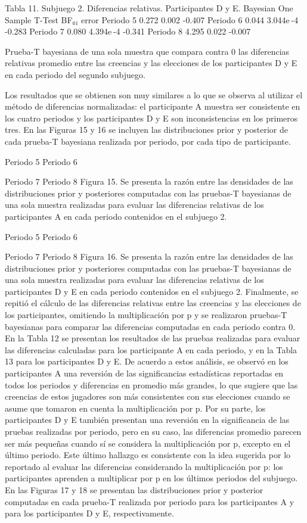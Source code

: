 Tabla 11. Subjuego 2. Diferencias relativas. Participantes D y E.
Bayesian One Sample T-Test 	
  	BF₀₁ 	error %
Periodo 5 		0.272 		0.002 		-0.407 
Periodo 6 		0.044 		3.044e -4 		-0.283 
Periodo 7 		0.080 		4.394e -4 		-0.341 
Periodo 8 		4.295 		0.022 		-0.007 
	
Prueba-T bayesiana de una sola muestra que compara contra 0 las diferencias relativas promedio entre las creencias y las elecciones de los participantes D y E en cada periodo del segundo subjuego.

Los resultados que se obtienen son muy similares a lo que se observa al utilizar el método de diferencias normalizadas: el participante A muestra ser consistente en los cuatro periodos y los participantes D y E son inconsistencias en los primeros tres. En las Figuras 15 y 16 se incluyen las distribuciones prior y posterior de cada prueba-T bayesiana realizada por periodo, por cada tipo de participante.

  
          Periodo 5					        Periodo 6
  
         Periodo 7					        Periodo 8
Figura 15. Se presenta la razón entre las densidades de las distribuciones prior y posteriores  computadas con las pruebas-T bayesianas de una sola muestra realizadas para evaluar las diferencias relativas de los participantes A en cada periodo contenidos en el subjuego 2.
  
         Periodo 5					        Periodo 6
  
          Periodo 7					       Periodo 8
Figura 16. Se presenta la razón entre las densidades de las distribuciones prior y posteriores  computadas con las pruebas-T bayesianas de una sola muestra realizadas para evaluar las diferencias relativas de los participantes D y E en cada periodo contenidos en el subjuego 2. 
Finalmente, se repitió el cálculo de las diferencias relativas entre las creencias y las elecciones de los participantes, omitiendo la multiplicación por p y se realizaron pruebas-T bayesianas para comparar las diferencias computadas en cada periodo contra 0. En la Tabla 12 se presentan los resultados de las pruebas realizadas para evaluar las diferencias calculadas para los participante A en cada periodo, y en la Tabla 13 para los participantes D y E. De acuerdo a estos análisis, se observó  en los participantes A una reversión de las significancias estadísticas reportadas en todos los periodos y diferencias en promedio más grandes, lo que sugiere que las creencias de estos jugadores son más consistentes con sus elecciones cuando se asume que tomaron en cuenta la multiplicación por p. Por su parte, los participantes D y E también presentan una reversión en la significancia de las pruebas realizadas por periodo, pero en su caso, las diferencias promedio parecen ser más pequeñas cuando sí se considera la multiplicación por p, excepto en el último periodo. Este último hallazgo es consistente con la idea sugerida por lo reportado al evaluar las diferencias considerando la multiplicación por p: los participantes aprenden a multiplicar por p en los últimos periodos del subjuego. En las Figuras 17 y 18 se presentan las distribuciones prior y posterior computadas en cada prueba-T realizada por periodo para los  participantes A y para los participantes D y E, respectivamente.


